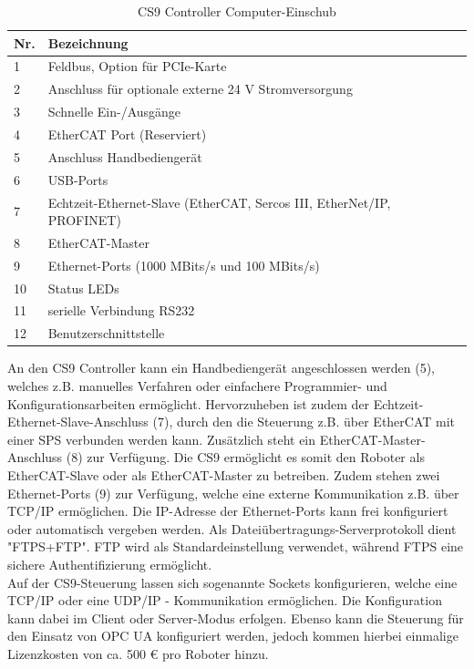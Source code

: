 \documentclass[ a4paper,
                oneside,
                toc=bibliography,
                toc=listof
                ]{scrbook}
\begin{document}
   	\begin{table}[h]
   		\caption{CS9 Controller Computer-Einschub}
   		\label{table:ComputerEinschub}
	   	\begin{tabular}{p{1cm}p{12cm}}
	   		\hline
	   		Nr. & Bezeichnung  \\ [0.5ex] 
	   		\hline
	   		1 & Feldbus, Option für PCIe-Karte  \\ 
	   		2 & Anschluss für optionale externe 24 V Stromversorgung  \\
	   		3 & Schnelle Ein-/Ausgänge  \\
	   		4 & EtherCAT Port (Reserviert) \\
	   		5 & Anschluss Handbediengerät  \\
	   		6 & USB-Ports \\  
	   		7 & Echtzeit-Ethernet-Slave (EtherCAT, Sercos III, EtherNet/IP, PROFINET)  \\ 
	   		8 & EtherCAT-Master  \\ 
	   		9 & Ethernet-Ports (1000 MBits/s und 100 MBits/s)  \\
	   		10 & Status LEDs  \\ 
	   		11 & serielle Verbindung RS232  \\
	   		12 & Benutzerschnittstelle  \\  
	   		\hline
	   	\end{tabular}
	\end{table}
   	An den CS9 Controller kann ein Handbediengerät angeschlossen werden (5), welches z.B.  manuelles Verfahren oder einfachere Programmier- und Konfigurationsarbeiten ermöglicht. Hervorzuheben ist zudem der Echtzeit-Ethernet-Slave-Anschluss (7), durch den die Steuerung z.B. über EtherCAT mit einer SPS verbunden werden kann. Zusätzlich steht ein EtherCAT-Master-Anschluss (8) zur Verfügung. Die CS9 ermöglicht es somit den Roboter als EtherCAT-Slave oder als EtherCAT-Master zu betreiben. Zudem stehen zwei Ethernet-Ports (9) zur Verfügung, welche eine externe Kommunikation z.B. über TCP/IP ermöglichen. Die IP-Adresse der Ethernet-Ports kann frei konfiguriert oder automatisch vergeben werden. Als Dateiübertragungs-Serverprotokoll dient "FTPS+FTP". FTP wird als Standardeinstellung verwendet, während FTPS eine sichere Authentifizierung ermöglicht. \\
   	Auf der CS9-Steuerung lassen sich sogenannte Sockets konfigurieren, welche eine TCP/IP oder eine UDP/IP - Kommunikation ermöglichen. Die Konfiguration kann dabei im Client oder Server-Modus erfolgen. \cite{CS9} Ebenso kann die Steuerung für den Einsatz von OPC UA konfiguriert werden, jedoch kommen hierbei einmalige Lizenzkosten von ca. 500 € pro Roboter hinzu.
   	 
\end{document}
